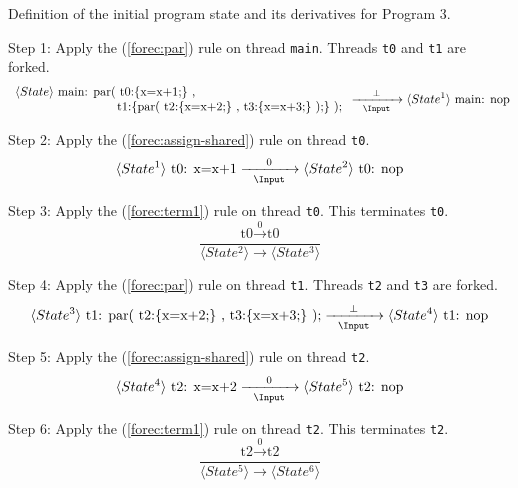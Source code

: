 \begin{table}[t]
	\caption{Definition of the initial program state and its derivatives for Program 3.}
	\label{table:forec_program_3}
\end{table}

\noindent
Step 1: Apply the (\ref{forec:par}) rule on thread \verb$main$.
Threads \verb$t0$ and \verb$t1$ are forked.
\begin{equation*}
	\begin{array}{l}
		\langle State \rangle ~ \text{main: par( t0:\{x=x+1;\} ,}	\\
		\text{~~~~~~~~~~~~~~~~~~~~~~~~~t1:\{par( t2:\{x=x+2;\} , t3:\{x=x+3;\} );\} );}
	\end{array}
		\xrightarrow[~~\Input~~]{\bot} 
	\langle State^1 \rangle ~ \text{main: nop}
\end{equation*}

\noindent
Step 2: Apply the (\ref{forec:assign-shared}) rule on thread \verb$t0$.
\begin{equation*}
	\langle State^1 \rangle ~ \text{t0: x=x+1}
		\xrightarrow[~~\Input~~]{0} 
	\langle State^2 \rangle ~ \text{t0: nop}
\end{equation*}

\noindent
Step 3: Apply the (\ref{forec:term1}) rule on thread \verb$t0$. 
This terminates \verb$t0$.
\begin{equation*}
	\frac{
			\text{t0} \xrightarrow{~~0~~} \text{t0}
		}{
			\langle State^2 \rangle \xrightarrow{~~~~~} \langle State^3 \rangle
		}
\end{equation*}

\noindent
Step 4: Apply the (\ref{forec:par}) rule on thread \verb$t1$. 
Threads \verb$t2$ and \verb$t3$ are forked.
\begin{equation*}
	\langle State^3 \rangle ~ \text{t1: par( t2:\{x=x+2;\} , t3:\{x=x+3;\} );}
		\xrightarrow[~~\Input~~]{\bot} 
	\langle State^4 \rangle ~ \text{t1: nop}
\end{equation*}


\noindent
Step 5: Apply the (\ref{forec:assign-shared}) rule on thread \verb$t2$.
\begin{equation*}
	\langle State^4 \rangle ~ \text{t2: x=x+2}
		\xrightarrow[~~\Input~~]{0} 
	\langle State^5 \rangle ~ \text{t2: nop}
\end{equation*}

\noindent
Step 6: Apply the (\ref{forec:term1}) rule on thread \verb$t2$. 
This terminates \verb$t2$.
\begin{equation*}
	\frac{
			\text{t2} \xrightarrow{~~0~~} \text{t2}
		}{
			\langle State^5 \rangle \xrightarrow{~~~~~} \langle State^6 \rangle
		}
\end{equation*}


